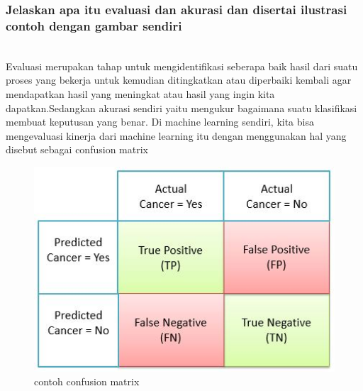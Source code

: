 \subsubsection{Jelaskan apa itu evaluasi dan akurasi dan disertai ilustrasi contoh dengan gambar sendiri}
\hfill\\
Evaluasi merupakan tahap untuk mengidentifikasi seberapa baik hasil dari suatu proses yang bekerja untuk kemudian ditingkatkan atau diperbaiki kembali agar mendapatkan hasil yang meningkat atau hasil yang ingin kita dapatkan.Sedangkan akurasi sendiri yaitu mengukur bagaimana suatu klasifikasi membuat keputusan yang benar. Di machine learning sendiri, kita bisa mengevaluasi kinerja dari machine learning itu dengan menggunakan hal yang disebut sebagai confusion matrix 
\begin{figure}[H]
    \includegraphics[width=12cm]{figures/1174079/2/confusionmatrix.jpg}
    \centering
    \caption{contoh confusion matrix}
\end{figure}

